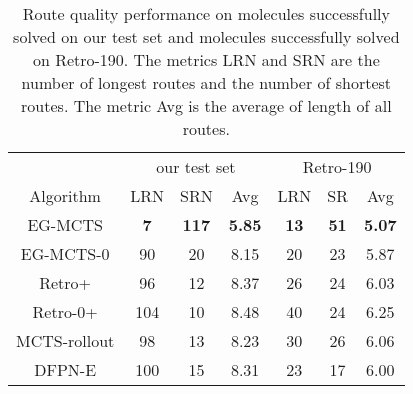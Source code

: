 \documentclass[sn-mathphys,Numbered]{sn-jnl}
\begin{document}
\begin{table}[!ht]
\begin{tabular}{ccccccccc}
  \end{tabular}

\end{table}



\begin{table}[!ht]
    \caption{Route quality performance on  molecules successfully solved on our test set and  molecules successfully solved on Retro-190. The metrics LRN and SRN are the number of longest routes and the number of shortest routes. The metric Avg is the average of length of all routes.}
    \centering
    \begin{tabular}{ccccccc}
            \toprule
            & \multicolumn{3}{c}{our test set}     & \multicolumn{3}{c}{Retro-190}             \\
            \cmidrule(r){2-4} \cmidrule(r){5-7} 
            Algorithm   & LRN   & SRN & Avg & LRN   & SR & Avg\\

            \midrule
            EG-MCTS     & \textbf{7}       & \textbf{117}    & \textbf{5.85} & \textbf{13}       & \textbf{51}    & \textbf{5.07}\\
            EG-MCTS-0   & 90        & 20   & 8.15  & 20        & 23   & 5.87\\
            Retro+      & 96        & 12   & 8.37   & 26        & 24   & 6.03\\
            Retro-0+    & 104        & 10   & 8.48   & 40        & 24   & 6.25\\
            MCTS-rollout      & 98        & 13   & 8.23  & 30       & 26   & 6.06\\
            DFPN-E      & 100        & 15   & 8.31  & 23        & 17   & 6.00   \\
            
            \bottomrule
        \end{tabular}

        \label{table-quality}
\end{table}
\end{document}
